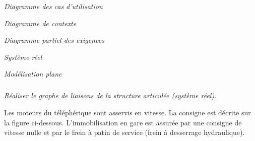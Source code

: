 \documentclass[10pt]{article}
\newif\ifprof
\begin{document}
\begin{minipage}[c]{.3\linewidth}
\begin{center}

\textit{Diagramme des cas d'utilisation}
\end{center}
\end{minipage} \hfill
\begin{minipage}[c]{.3\linewidth}
\begin{center}

\textit{Diagramme de contexte}
\end{center}
\end{minipage} \hfill
\begin{minipage}[c]{.38\linewidth}
\begin{center}

\textit{Diagramme partiel des exigences}
\end{center}
\end{minipage}


\begin{minipage}[c]{.33\linewidth}
\begin{center}

\textit{Système réel}
\end{center}
\end{minipage} \hfill
\begin{minipage}[c]{.63\linewidth}
\begin{center}

\textit{Modélisation plane}
\end{center}
\end{minipage}

\vspace{.25cm}



\fi
\subparagraph{}
\textit{Réaliser le graphe de liaisons de la structure articulée (système réel). }
\ifprof
\begin{corrige}
\begin{center}
\end{center}
\end{corrige}
\else
\fi


Les moteurs du téléphérique sont asservis en vitesse. La consigne est décrite sur la figure ci-dessous. L’immobilisation en gare est assurée par une consigne de vitesse nulle et par le frein à patin de service (frein à desserrage hydraulique).
 
\end{document}
